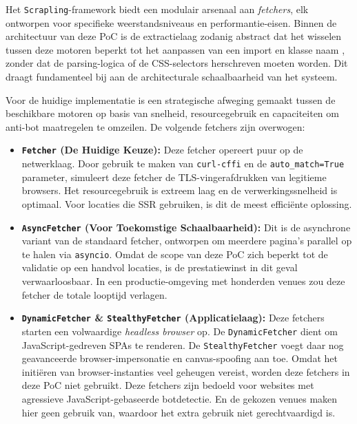 Het \texttt{Scrapling}-framework biedt een modulair arsenaal aan 
\textit{fetchers}, elk ontworpen voor specifieke 
weerstandsniveaus en performantie-eisen. Binnen de architectuur van 
deze \gls{PoC} is de extractielaag zodanig abstract dat het 
wisselen tussen deze motoren beperkt tot het aanpassen van een import en klasse naam
, zonder dat de parsing-logica of de 
CSS-selectors herschreven moeten worden. Dit draagt fundamenteel bij 
aan de architecturale schaalbaarheid van het systeem.

Voor de huidige implementatie is een strategische afweging gemaakt 
tussen de beschikbare motoren op basis van snelheid, resourcegebruik 
en capaciteiten om anti-bot maatregelen te omzeilen. De volgende fetchers zijn overwogen\autocite{ScraplingFetchers}:

\begin{itemize}
    \item \textbf{\texttt{Fetcher} (De Huidige Keuze):} 
    Deze fetcher opereert puur op de netwerklaag. Door gebruik te maken 
    van \texttt{curl-cffi} en de \texttt{auto\_match=True} parameter, 
    simuleert deze fetcher de TLS-vingerafdrukken van legitieme 
    browsers. Het resourcegebruik is extreem laag en de 
    verwerkingssnelheid is optimaal. Voor locaties die \gls{SSR} gebruiken, is dit de meest efficiënte oplossing.
    
    \item \textbf{\texttt{AsyncFetcher} (Voor Toekomstige Schaalbaarheid):} 
    Dit is de asynchrone variant van de standaard fetcher, ontworpen 
    om meerdere pagina's parallel op te halen via \texttt{asyncio}. 
    Omdat de scope van deze \gls{PoC} zich beperkt tot de validatie 
    op een handvol locaties, is de prestatiewinst in dit geval verwaarloosbaar. 
    In een productie-omgeving met honderden venues 
    zou deze fetcher de totale looptijd verlagen.
    
    \item \textbf{\texttt{DynamicFetcher} \& \texttt{StealthyFetcher} (Applicatielaag):} 
    Deze fetchers starten een volwaardige \textit{headless browser} op. 
    De \texttt{DynamicFetcher} dient om JavaScript-gedreven 
    \gls{SPA}s te renderen. De \texttt{StealthyFetcher} 
    voegt daar nog geavanceerde browser-impersonatie en canvas-spoofing aan toe. 
    Omdat het initiëren van browser-instanties veel geheugen vereist, 
    worden deze fetchers in deze \gls{PoC} niet gebruikt. Deze fetchers zijn bedoeld voor websites met agressieve JavaScript-gebaseerde botdetectie. 
    En de gekozen venues maken hier geen gebruik van, waardoor het extra gebruik niet gerechtvaardigd is.
\end{itemize}

